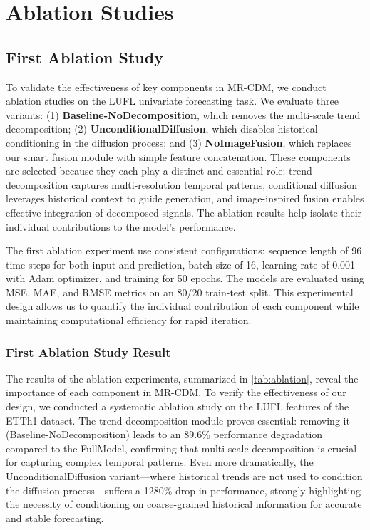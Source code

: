 \appendix
\setcounter{secnumdepth}{2}
\setcounter{subsection}{0}

\renewcommand{\thesubsection}{\thesection.\arabic{subsection}}

\section{Ablation Studies}


\subsection{First Ablation Study}
\label{sec:ablation1}
To validate the effectiveness of key components in MR-CDM, we conduct ablation studies on the LUFL univariate forecasting task. We evaluate three variants:
(1) \textbf{Baseline-NoDecomposition}, which removes the multi-scale trend decomposition;
(2) \textbf{UnconditionalDiffusion}, which disables historical conditioning in the diffusion process; and
(3) \textbf{NoImageFusion}, which replaces our smart fusion module with simple feature concatenation.
These components are selected because they each play a distinct and essential role: trend decomposition captures multi-resolution temporal patterns, conditional diffusion leverages historical context to guide generation, and image-inspired fusion enables effective integration of decomposed signals. The ablation results help isolate their individual contributions to the model’s performance.

The first ablation experiment use consistent configurations: sequence length of 96 time steps for both input and prediction, batch size of 16, learning rate of 0.001 with Adam optimizer, and training for 50 epochs. The models are evaluated using MSE, MAE, and RMSE metrics on an 80/20 train-test split. This experimental design allows us to quantify the individual contribution of each component while maintaining computational efficiency for rapid iteration.


\subsubsection{First Ablation Study Result}The results of the ablation experiments, summarized in \autoref{tab:ablation}, reveal the importance of each component in MR-CDM. To verify the effectiveness of our design, we conducted a systematic ablation study on the LUFL features of the ETTh1 dataset. The trend decomposition module proves essential: removing it (Baseline-NoDecomposition) leads to an 89.6\% performance degradation compared to the FullModel, confirming that multi-scale decomposition is crucial for capturing complex temporal patterns. Even more dramatically, the UnconditionalDiffusion variant—where historical trends are not used to condition the diffusion process—suffers a 1280\% drop in performance, strongly highlighting the necessity of conditioning on coarse-grained historical information for accurate and stable forecasting.

